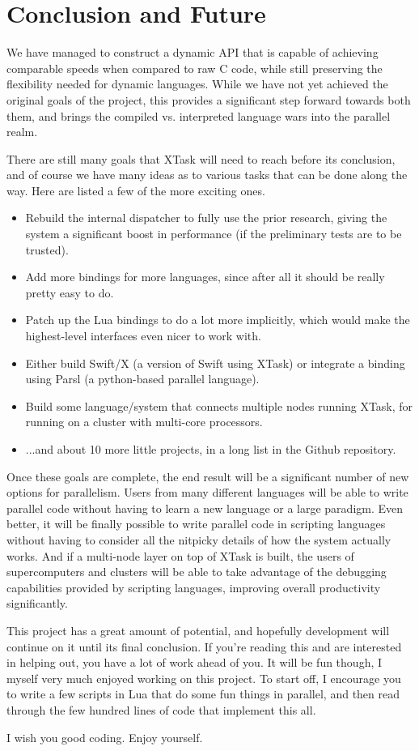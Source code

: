 \documentclass{article}
\begin{document}

\section{Conclusion and Future}
We have managed to construct a dynamic API that is capable of achieving comparable speeds when compared to raw C code, while still preserving the flexibility needed for dynamic languages. While we have not yet achieved the original goals of the project, this provides a significant step forward towards both them, and brings the compiled vs. interpreted language wars into the parallel realm.

There are still many goals that XTask will need to reach before its conclusion, and of course we have many ideas as to various tasks that can be done along the way. Here are listed a few of the more exciting ones.
\begin{itemize}
    \item Rebuild the internal dispatcher to fully use the prior research, giving the system a significant boost in performance (if the preliminary tests are to be trusted).
    \item Add more bindings for more languages, since after all it should be really pretty easy to do.
    \item Patch up the Lua bindings to do a lot more implicitly, which would make the highest-level interfaces even nicer to work with.
    \item Either build Swift/X (a version of Swift using XTask) or integrate a binding using Parsl (a python-based parallel language).
    \item Build some language/system that connects multiple nodes running XTask, for running on a cluster with multi-core processors.
    \item ...and about 10 more little projects, in a long list in the Github repository.
\end{itemize}

Once these goals are complete, the end result will be a significant number of new options for parallelism. Users from many different languages will be able to write parallel code without having to learn a new language or a large paradigm. Even better, it will be finally possible to write parallel code in scripting languages without having to consider all the nitpicky details of how the system actually works. And if a multi-node layer on top of XTask is built, the users of supercomputers and clusters will be able to take advantage of the debugging capabilities provided by scripting languages, improving overall productivity significantly.

\vfill

This project has a great amount of potential, and hopefully development will continue on it until its final conclusion. If you're reading this and are interested in helping out, you have a lot of work ahead of you. It will be fun though, I myself very much enjoyed working on this project. To start off, I encourage you to write a few scripts in Lua that do some fun things in parallel, and then read through the few hundred lines of code that implement this all.

I wish you good coding. Enjoy yourself.
\end{document}

